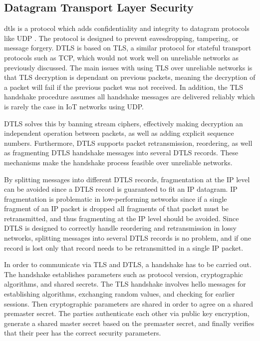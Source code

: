 \documentclass[0-thesis.tex]{subfiles}
\begin{document}
\subsection{Datagram Transport Layer Security}
\label{ssec:dtls}
\acrfull{dtls} is a protocol which adds confidentiality and integrity to datagram
protocols like UDP \parencite{rfc6347}. The protocol is designed to prevent eavesdropping,
tampering, or message forgery. DTLS is based on TLS, a similar protocol for stateful
transport protocols such as TCP, which would not work well on unreliable networks as
previously discussed. The main issues with using TLS over unreliable networks is that TLS
decryption is dependant on previous packets, meaning the decryption of a packet will fail
if the previous packet was not received. In addition, the TLS handshake procedure assumes
all handshake messages are delivered reliably which is rarely the case in IoT networks
using UDP.

DTLS solves this by banning stream ciphers, effectively making decryption an independent
operation between packets, as well as adding explicit sequence numbers. Furthermore, DTLS
supports packet retransmission, reordering, as well as fragmenting DTLS handshake messages
into several DTLS records. These mechanisms make the handshake process feasible over
unreliable networks. 

By splitting messages into different DTLS records, fragmentation at the IP level can be
avoided since a DTLS record is guaranteed to fit an IP datagram. IP fragmentation is
problematic in low-performing networks since if a single fragment of an IP packet is
dropped all fragments of that packet must be retransmitted, and thus fragmenting at the IP
level should be avoided. Since DTLS is designed to correctly handle reordering and
retransmission in lossy networks, splitting messages into several DTLS records is no
problem, and if one record is lost only that record needs to be retransmitted in a single
IP packet.

In order to communicate via TLS and DTLS, a handshake has to be carried out. The handshake
establishes parameters such as protocol version, cryptographic algorithms, and shared
secrets. The TLS handshake involves hello messages for establishing algorithms, exchanging
random values, and checking for earlier sessions. Then cryptographic parameters are shared
in order to agree on a shared premaster secret. The parties authenticate each other via
public key encryption, generate a shared master secret based on the premaster secret, and
finally verifies that their peer has the correct security parameters.
\end{document}
